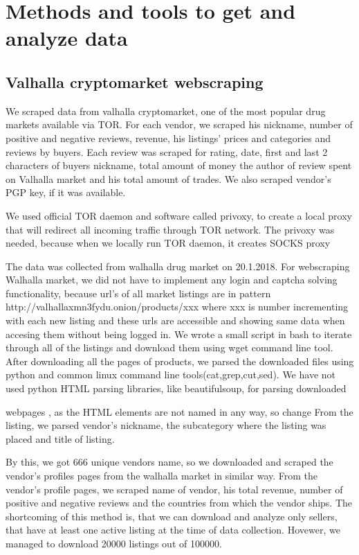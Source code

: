 \documentclass[
  digital, %
  table,   %
  lof,     %
  lot,     %
  oneside
]{fithesis3}
\begin{document}
\chapter{Methods and tools to get and analyze data}

\section{Valhalla cryptomarket webscraping}
We scraped data from valhalla cryptomarket, one of the most popular drug markets available via TOR.
For each vendor, we scraped his nickname, number of positive and negative reviews,
revenue, his listings' prices and categories and reviews by buyers.
Each review was scraped for rating, date, first and last 2 characters of buyers nickname,
total amount of money the author of review spent on Valhalla market and his total amount of trades.
We also scraped vendor's PGP key, if it was available. 

We used official TOR daemon and software called privoxy, to create a local proxy that will redirect all
incoming traffic through TOR network. The privoxy was needed, because when we locally run TOR daemon,
it creates SOCKS proxy

The data was collected from walhalla drug market on 20.1.2018.
For webscraping Walhalla market, we did not have to implement any login and captcha solving functionality,
because url's of all market listings are in pattern http://valhallaxmn3fydu.onion/products/xxx where 
xxx is number incrementing with each new listing and these urls are accessible and showing same data when 
accesing them without being logged in.
We wrote a small script in bash to iterate through all of the listings and download them using wget command line tool.
After downloading all the pages of products, we parsed the downloaded files using python and common linux command 
line tools(cat,grep,cut,sed). We have not used python HTML parsing libraries, like beautifulsoup, for parsing downloaded

webpages , as the HTML elements
are not named in any way, so change 
From the listing, we parsed vendor's nickname, the subcategory where the listing was placed and title of listing.

By this, we got 666 unique vendors name, so we downloaded and scraped the vendor's profiles pages from the walhalla 
market in similar way.
From the vendor's profile pages, we scraped name of vendor, his total revenue, number of positive and negative reviews 
and the countries from which the vendor ships.
The shortcoming of this method is, that we can download and analyze only sellers, 
that have at least one active listing at the time of data collection. 
Hovewer, we managed to download 20000 listings out of 100000.
\end{document}
